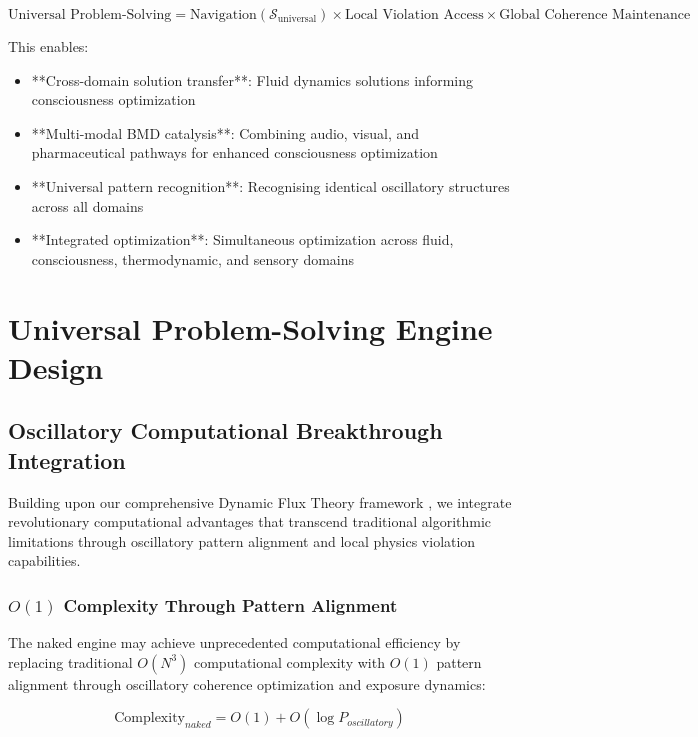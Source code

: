 \documentclass[11pt,a4paper]{article}
\theoremstyle{remark}
\begin{document}
\begin{equation}
\text{Universal Problem-Solving} = \text{Navigation}(\mathcal{S}_{\text{universal}}) \times \text{Local Violation Access} \times \text{Global Coherence Maintenance}
\end{equation}

This enables:
\begin{itemize}
\item **Cross-domain solution transfer**: Fluid dynamics solutions informing consciousness optimization
\item **Multi-modal BMD catalysis**: Combining audio, visual, and pharmaceutical pathways for enhanced consciousness optimization
\item **Universal pattern recognition**: Recognising identical oscillatory structures across all domains
\item **Integrated optimization**: Simultaneous optimization across fluid, consciousness, thermodynamic, and sensory domains
\end{itemize}

\section{Universal Problem-Solving Engine Design}

\subsection{Oscillatory Computational Breakthrough Integration}

Building upon our comprehensive Dynamic Flux Theory framework \cite{sachikonye2024flux}, we integrate revolutionary computational advantages that transcend traditional algorithmic limitations through oscillatory pattern alignment and local physics violation capabilities.

\subsubsection{$O(1)$ Complexity Through Pattern Alignment}

The naked engine may achieve unprecedented computational efficiency by replacing traditional $O(N^3)$ computational complexity with $O(1)$ pattern alignment through oscillatory coherence optimization and exposure dynamics:

\begin{equation}
\text{Complexity}_{naked} = O(1) + O(\log P_{oscillatory})
\end{equation}
\end{document}
